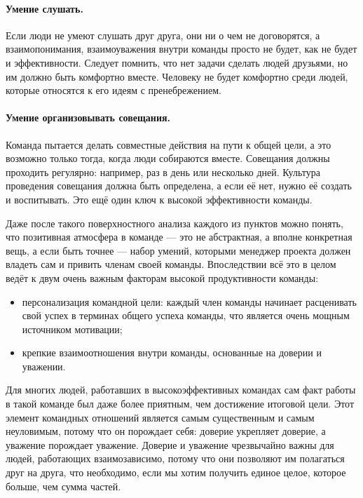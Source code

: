 \documentclass{../../text-style}
\begin{document}
\paragraph*{Умение слушать.} Если люди не умеют слушать друг друга, они ни о чем не договорятся, а взаимопонимания, взаимоуважения внутри команды просто не будет, как не будет и эффективности. Следует помнить, что нет задачи сделать людей друзьями, но им должно быть комфортно вместе. Человеку не будет комфортно среди людей, которые относятся к его идеям с пренебрежением.

\paragraph*{Умение организовывать совещания.} Команда пытается делать совместные действия на пути к общей цели, а это возможно только тогда, когда люди собираются вместе. Совещания должны проходить регулярно: например, раз в день или несколько дней. Культура проведения совещания должна быть определена, а если её нет, нужно её создать и воспитывать. Это ещё один ключ к высокой эффективности команды.

Даже после такого поверхностного анализа каждого из пунктов можно понять, что позитивная атмосфера в команде --- это не абстрактная, а вполне конкретная вещь, а если быть точнее --- набор умений, которыми менеджер проекта должен владеть сам и привить членам своей команды. Впоследствии всё это в целом ведёт к двум очень важным факторам высокой продуктивности команды:

\begin{itemize}
    \item персонализация командной цели: каждый член команды начинает расценивать свой успех в терминах общего успеха команды, что является очень мощным источником мотивации;
    \item крепкие взаимоотношения внутри команды, основанные на доверии и уважении. 
\end{itemize}

Для многих людей, работавших в высокоэффективных командах сам факт работы в такой команде был даже более приятным, чем достижение итоговой цели. Этот элемент командных отношений является самым существенным и самым неуловимым, потому что он порождает себя: доверие укрепляет доверие, а уважение порождает уважение. Доверие и уважение чрезвычайно важны для людей, работающих взаимозависимо, потому что они позволяют им полагаться друг на друга, что необходимо, если мы хотим получить единое целое, которое больше, чем сумма частей.
\end{document}
